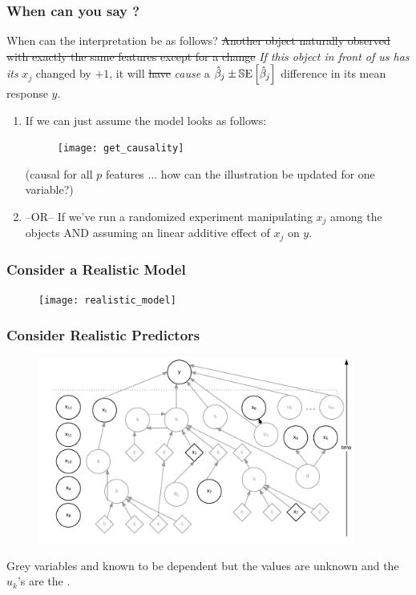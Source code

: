 \documentclass[handout]{beamer}
\begin{document}
\begin{frame}\frametitle{When can you say ?}

\small

When can the interpretation be  as follows? \sout{Another object naturally observed with exactly the same features except for a change} \pause \emph{If this object in front of us has its} $x_j$ changed by $+1$, it will \sout{have} \pause  \emph{cause} a $\hat{\beta}_j \pm \mathbb{S}\text{E}\left[\hat{\beta}_j\right]$ difference in its mean response $y$.

\begin{enumerate}
\item If we can just assume the model looks as follows:

\vspace{-0.3cm}

\begin{figure}
\centering
\texttt{[image: get\_causality]}
\end{figure}

(causal for all $p$ features ... how can the illustration be updated for one variable?)  \pause 

\item --OR-- If we've run a randomized experiment manipulating $x_j$ among the objects AND assuming an linear additive effect of $x_j$ on $y$.
\end{enumerate}

\end{frame}

\begin{frame}\frametitle{Consider a Realistic Model}

\begin{figure}
\centering
\texttt{[image: realistic\_model]}
\end{figure}


\end{frame}

\begin{frame}\frametitle{Consider Realistic Predictors}

\begin{figure}
\centering
\includegraphics[width=4.1in]{realistic_predictors}
\end{figure}

Grey variables and known to be dependent but the values are unknown and the $u_k$'s are the .

\end{frame}
\end{document}
